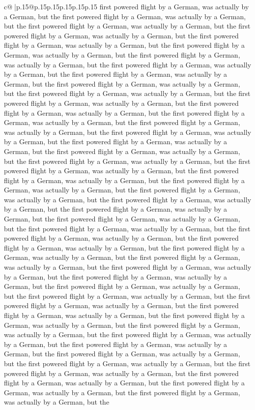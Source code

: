 \documentclass{article}
\begin{document}
{\begin{supertabular}{c@{$\;$}|p{.15\linewidth}@{}p{.15\linewidth}p{.15\linewidth}p{.15\linewidth}p{.15\linewidth}p{.15\linewidth}}
{{{first powered flight by a German, was actually by a German, but the first powered flight by a German, was actually by a German, but the first powered flight by a German, was actually by a German, but the first powered flight by a German, was actually by a German, but the first powered flight by a German, was actually by a German, but the first powered flight by a German, was actually by a German, but the first powered flight by a German, was actually by a German, but the first powered flight by a German, was actually by a German, but the first powered flight by a German, was actually by a German, but the first powered flight by a German, was actually by a German, but the first powered flight by a German, was actually by a German, but the first powered flight by a German, was actually by a German, but the first powered flight by a German, was actually by a German, but the first powered flight by a German, was actually by a German, but the first powered flight by a German, was actually by a German, but the first powered flight by a German, was actually by a German, but the first powered flight by a German, was actually by a German, but the first powered flight by a German, was actually by a German, but the first powered flight by a German, was actually by a German, but the first powered flight by a German, was actually by a German, but the first powered flight by a German, was actually by a German, but the first powered flight by a German, was actually by a German, but the first powered flight by a German, was actually by a German, but the first powered flight by a German, was actually by a German, but the first powered flight by a German, was actually by a German, but the first powered flight by a German, was actually by a German, but the first powered flight by a German, was actually by a German, but the first powered flight by a German, was actually by a German, but the first powered flight by a German, was actually by a German, but the first powered flight by a German, was actually by a German, but the first powered flight by a German, was actually by a German, but the first powered flight by a German, was actually by a German, but the first powered flight by a German, was actually by a German, but the first powered flight by a German, was actually by a German, but the first powered flight by a German, was actually by a German, but the first powered flight by a German, was actually by a German, but the first powered flight by a German, was actually by a German, but the first powered flight by a German, was actually by a German, but the first powered flight by a German, was actually by a German, but the first powered flight by a German, was actually by a German, but the first powered flight by a German, was actually by a German, but the first powered flight by a German, was actually by a German, but the first powered flight by a German, was actually by a German, but the first powered flight by a German, was actually by a German, but the first powered flight by a German, was actually by a German, but the first powered flight by a German, was actually by a German, but the first powered flight by a German, was actually by a German, but the }}}
\end{supertabular}}
\end{document}
